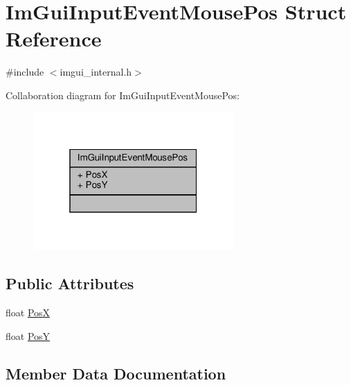 \hypertarget{structImGuiInputEventMousePos}{}\section{Im\+Gui\+Input\+Event\+Mouse\+Pos Struct Reference}
\label{structImGuiInputEventMousePos}


{\ttfamily \#include $<$imgui\+\_\+internal.\+h$>$}



Collaboration diagram for Im\+Gui\+Input\+Event\+Mouse\+Pos\+:
\nopagebreak
\begin{figure}[H]
\begin{center}
\leavevmode
\includegraphics[width=217pt]{structImGuiInputEventMousePos__coll__graph}
\end{center}
\end{figure}
\subsection*{Public Attributes}
\begin{DoxyCompactItemize}
\item 
float \hyperlink{structImGuiInputEventMousePos_a74df17b1a446071618fcd868a32102d8}{PosX}
\item 
float \hyperlink{structImGuiInputEventMousePos_a515eb4e5c6cb604fabdb26dc99d14c6f}{PosY}
\end{DoxyCompactItemize}


\subsection{Member Data Documentation}
\mbox{\label{structImGuiInputEventMousePos_a74df17b1a446071618fcd868a32102d8}} 
